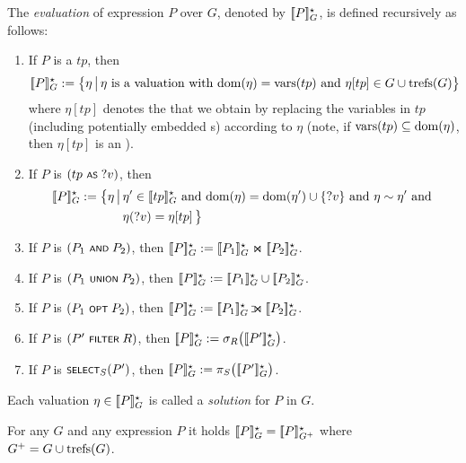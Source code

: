 	The \emph{evaluation} of {\SPARQLplus} expression $P$ over {\RDFplusGraph} $G$,
denoted by $[\![P]\!]^\star_{G}$, is defined recursively as follows:
\begin{enumerate}
	\item If $P$ is a {\TPplus} $tp$, then
		\begin{equation*}
			[\![P]\!]^\star_{G} := \big\lbrace \eta \,\big|\,
				\eta \text{ is a valuation with } \mathrm{dom}(\eta) = \mathrm{vars}(tp)
				\text{ and } \eta[tp] \in G \cup \mathrm{trefs}(G)
			\big\rbrace
		\end{equation*}
		where $\eta[tp]$ denotes the {\TPplus} that we obtain by replacing the variables in $tp$ (including potentially embedded {\TPplus}s) according to $\eta$ (note, if $\mathrm{vars}(tp) \subseteq \mathrm{dom}(\eta)$, then $\eta[tp]$ is an {\RDFplusTriple}).
		\vspace{1ex} %
	\item If $P$ is $(tp \text{ \normalfont\scriptsize\textsf{AS} } ?v)$, then
		\begin{align*}
			\fctEvalPlus{P}{G} := \big\lbrace \eta \,\big|\,
				& \eta' \in \fctEvalPlus{tp}{G} 
				\text{ and } %
					\fctDom{\eta} = \fctDom{\eta'}\cup \lbrace ?v \rbrace
				\text{ and } \eta \compatible \eta' \text{ and }\\
				& \eta(?v) = \eta[tp] \,
			\big\rbrace
		\end{align*}
	\item If $P$ is $(P_1 \text{ \normalfont\scriptsize\textsf{AND} } P_2)$, then $[\![P]\!]^\star_{G} := [\![P_1]\!]^\star_{G} \Join [\![P_2]\!]^\star_{G}$.
	\item If $P$ is $(P_1 \text{ \normalfont\scriptsize\textsf{UNION} } P_2)$, then $[\![P]\!]^\star_{G} := [\![P_1]\!]^\star_{G} \cup [\![P_2]\!]^\star_{G}$.
	\item If $P$ is $(P_1 \text{ \normalfont\scriptsize\textsf{OPT} } P_2)$, then $\fctEvalPlus{P}{G} := \fctEvalPlus{P_1}{G} \LJoin \fctEvalPlus{P_2}{G}$.
	\item If $P$ is $(P' \text{ \normalfont\scriptsize\textsf{FILTER} } R)$, then $[\![P]\!]^\star_{G} := \sigma_R\bigl( [\![P']\!]^\star_{G} \bigr)$.
	\item If $P$ is $\text{\normalfont\scriptsize\textsf{SELECT}}_S(P')$, then $[\![P]\!]^\star_{G} := \pi_S\bigl( [\![P']\!]^\star_{G} \bigr)$.
\end{enumerate}
Each valuation $\eta \in [\![P]\!]^\star_{G}$ is called a \emph{solution} for $P$ in $G$.

\begin{proposition}
	For any {\RDFplusGraph} $G$ and any {\SPARQLplus} expression $P$ it holds $[\![P]\!]^\star_{G} = [\![P]\!]^\star_{G^+}$ where $G^+ = G \cup \mathrm{trefs}(G)$.
\end{proposition}

